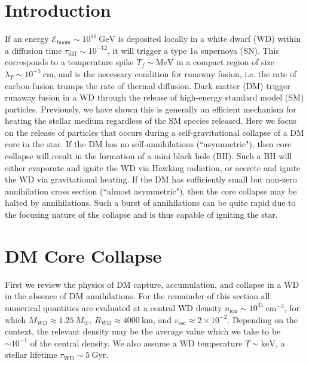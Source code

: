 \documentclass[preprintnumbers,amsmath,amssymb,prd,superscriptaddress]{revtex4}
\newcommand{\Eboom}{\mathcal{E}_\text{boom}}
\newcommand{\GeV}{\text{GeV}}
\newcommand{\MeV}{\text{MeV}}
\newcommand{\cm}{\text{cm}}
\begin{document}
\section{Introduction}
If an energy $\Eboom \sim 10^{16} ~\GeV$ is deposited locally in a white dwarf (WD) within a diffusion time $\tau_\text{diff} \sim 10^{-12}$, it will trigger a type 1a supernova (SN).  
This corresponds to a temperature spike $T_f \sim \MeV$ in a compact region of size $\lambda_T \sim 10^{-5} ~\cm$, and is the necessary condition for runaway fusion, i.e. the rate of carbon fusion trumps the rate of thermal diffusion.
Dark matter (DM) trigger runaway fusion in a WD through the release of high-energy standard model (SM) particles. 
Previously, we have shown this is generally an efficient mechanism for heating the stellar medium regardless of the SM species released.  
Here we focus on the release of particles that occurs during a self-gravitational collapse of a DM core in the star.
If the DM has no self-annihilations (``asymmetric"), then core collapse will result in the formation of a mini black hole (BH).
Such a BH will either evaporate and ignite the WD via Hawking radiation, or accrete and ignite the WD via gravitational heating. 
If the DM has sufficiently small but non-zero annihilation cross section (``almost asymmetric"), then the core collapse may be halted by annihilations.
Such a burst of annihilations can be quite rapid due to the focusing nature of the collapse and is thus capable of igniting the star.

\section{DM Core Collapse}
First we review the physics of DM capture, accumulation, and collapse in a WD in the absence of DM annihilations.
For the remainder of this section all numerical quantities are evaluated at a central WD density $n_\text{ion} \sim 10^{31} ~\cm^{-3}$, for which $M_\text{WD} \approx 1.25 ~M_{\astrosun}$, $R_\text{WD} \approx 4000 ~\text{km}$, and $v_\text{esc} \approx 2 \times 10^{-2}$. 
Depending on the context, the relevant density may be the average value which we take to be $\sim 10^{-1}$ of the central density. 
We also assume a WD temperature $T \sim \text{keV}$, a stellar lifetime $\tau_\text{WD} \sim 5~\text{Gyr}$. 
\end{document}
